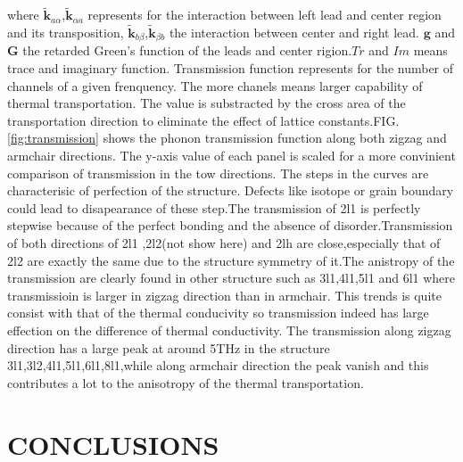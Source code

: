 \documentclass[%
 reprint,
 amsmath,amssymb,
 aps,
 prb,
]{revtex4-1}
\begin{document}
where $\mathbf{\widetilde{k}}_{a\alpha}$,$\mathbf{\widetilde{k}}_{\alpha a}$ represents for the interaction between left lead and center region and its transposition,  $\mathbf{\widetilde{k}}_{b\beta}$,$\mathbf{\widetilde{k}}_{\beta b}$ the interaction between center and right lead. $\mathbf{g}$ and $\mathbf{G}$ the retarded Green's function of the leads and center rigion.$Tr$ and $Im$ means trace and imaginary function. Transmission function represents for the number of channels of a given frenquency. The more chanels means larger capability of thermal transportation. The value is substracted by the cross area of the transportation direction to eliminate the effect of lattice constants.FIG.\ref{fig:transmission} shows the phonon transmission function along both zigzag and armchair directions. The y-axis value of each panel is scaled for a more convinient comparison of transmission in the tow directions. The steps in the curves are  characterisic of perfection of the structure. Defects like isotope or grain boundary could lead to disapearance of these step.The transmission of  2l1 is perfectly stepwise because of the perfect bonding and the absence of disorder.Transmission of both directions of 2l1 ,2l2(not show here) and 2lh are close,especially that of 2l2 are exactly the same due to the structure symmetry of it.The anistropy of the transmission are clearly found in other structure such as 3l1,4l1,5l1 and 6l1 where transmissioin is larger in zigzag direction than in armchair. This trends is quite consist with that of the thermal conducivity so transmission indeed has large effection on the difference of thermal conductivity. The transmission along zigzag direction has a large peak at around 5THz in the structure 3l1,3l2,4l1,5l1,6l1,8l1,while along armchair direction the peak vanish and this contributes a lot to the anisotropy of the thermal transportation.



\section{CONCLUSIONS}
\end{document}
